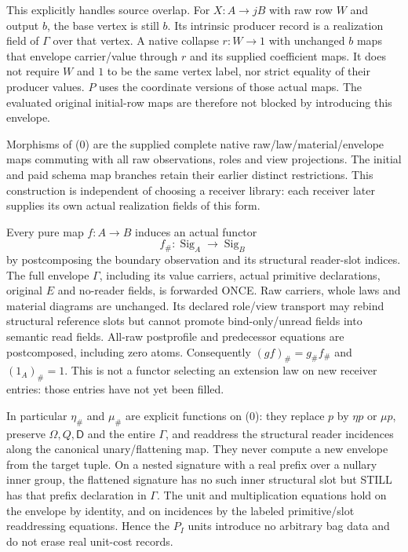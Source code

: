 \documentclass[11pt]{article}
\begin{document}
This explicitly handles source overlap. For $X:A\to jB$ with raw row $W$ and output $b$, the base vertex is still $b$. Its intrinsic producer record is a realization field of $\Gamma$ over that vertex. A native collapse $r:W\to1$ with unchanged $b$ maps that envelope carrier/value through $r$ and its supplied coefficient maps. It does not require $W$ and $1$ to be the same vertex label, nor strict equality of their producer values. $P$ uses the coordinate versions of those actual maps. The evaluated original initial-row maps are therefore not blocked by introducing this envelope.

Morphisms of (0) are the supplied complete native raw/law/material/envelope maps commuting with all raw observations, roles and view projections. The initial and paid schema map branches retain their earlier distinct restrictions. This construction is independent of choosing a receiver library: each receiver later supplies its own actual realization fields of this form.

Every pure map $f:A\to B$ induces an actual functor
\[
 f_\#: \operatorname{Sig}_A\longrightarrow\operatorname{Sig}_B
\]
by postcomposing the boundary observation and its structural reader-slot indices. The full envelope $\Gamma$, including its value carriers, actual primitive declarations, original $E$ and no-reader fields, is forwarded ONCE. Raw carriers, whole laws and material diagrams are unchanged. Its declared role/view transport may rebind structural reference slots but cannot promote bind-only/unread fields into semantic read fields. All-raw postprofile and predecessor equations are postcomposed, including zero atoms. Consequently $(gf)_\#=g_\#f_\#$ and $(1_A)_\#=1$. This is not a functor selecting an extension law on new receiver entries: those entries have not yet been filled.

In particular $\eta_\#$ and $\mu_\#$ are explicit functions on (0): they replace $p$ by $\eta p$ or $\mu p$, preserve $\Omega,Q,\mathsf D$ and the entire $\Gamma$, and readdress the structural reader incidences along the canonical unary/flattening map. They never compute a new envelope from the target tuple. On a nested signature with a real prefix over a nullary inner group, the flattened signature has no such inner structural slot but STILL has that prefix declaration in $\Gamma$. The unit and multiplication equations hold on the envelope by identity, and on incidences by the labeled primitive/slot readdressing equations. Hence the $P_I$ units introduce no arbitrary bag data and do not erase real unit-cost records.
\end{document}
